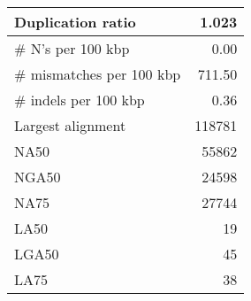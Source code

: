 \documentclass[12pt,a4paper]{article}
\begin{document}
\begin{table}[ht]
\begin{center}
\begin{tabular}{|l*{1}{|r}|}
Duplication ratio & 1.023 \\ \hline
\# N's per 100 kbp & 0.00 \\ \hline
\# mismatches per 100 kbp & 711.50 \\ \hline
\# indels per 100 kbp & 0.36 \\ \hline
Largest alignment & 118781 \\ \hline
NA50 & 55862 \\ \hline
NGA50 & 24598 \\ \hline
NA75 & 27744 \\ \hline
LA50 & 19 \\ \hline
LGA50 & 45 \\ \hline
LA75 & 38 \\ \hline
\end{tabular}
\end{center}
\end{table}
\end{document}
